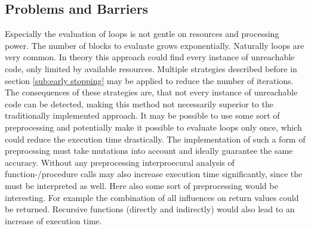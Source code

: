 \subsection{Problems and Barriers}
\label{sub:problems and barriers}
Especially the evaluation of loops is not gentle on resources and processing power. The number of blocks to evaluate grows exponentially. Naturally loops are very common. In theory this approach could find every instance of unreachable code, only limited by available resources. Multiple strategies described before in section \ref{sub:early stopping} may be applied to reduce the number of iterations.
The consequences of these strategies are, that not every instance of unreachable code can be detected, making this method not necessarily superior to the traditionally implemented approach.
It may be possible to use some sort of preprocessing and potentially make it possible to evaluate loops only once, which could reduce the execution time drastically.
The implementation of such a form of preprocssing must take mutations into account and ideally guarantee the same accuracy.
Without any preprocessing interproecural analysis of function-/procedure calls may also increase execution time significantly, since the must be interpreted as well. Here also some sort of preprocessing would be interesting. For example the combination of all influences on return values could be returned. 
Recursive functions (directly and indirectly) would also lead to an increase of execution time.
